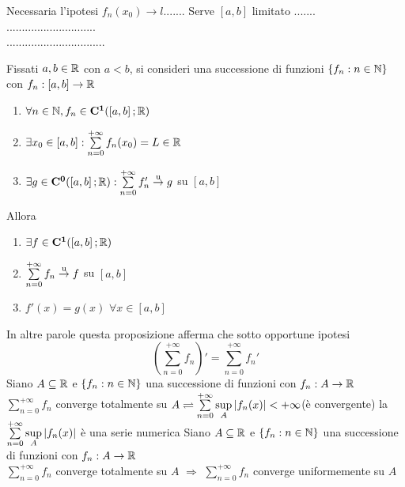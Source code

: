 \observation
Necessaria l'ipotesi $f_n(x_0)\to l$.......
\observation
Serve $\left[a,b\right]$ limitato .......\\
.............................\\
................................\\
\begin{corollary}
	\label{coro:deriv_series_series_of_deriv}
	Fissati $a,b\in \mathbb{R}$ con $a<b$, si consideri una successione di funzioni $\left\{f_n:n\in\mathbb{N}\right\}$ con $f_n:\left[a,b\right]\to \mathbb{R}$
	\begin{enumerate}
		\item $\forall n\in\mathbb{N}, f_n\in \mathbf{C^{1}}(\left[a,b\right]; \mathbb{R})$
		\item $\exists x_0\in\left[a,b\right]: \sum\limits_{n=0}^{+\infty}f_n(x_0)=L\in \mathbb{R}$
		\item $\exists g \in \mathbf{C^{0}}(\left[a,b\right]; \mathbb{R}): \sum\limits_{n=0}^{+\infty}f'_n \overset{\text{u}}{\to} g$ su $\left[a,b\right]$
	\end{enumerate}
	Allora
	\begin{enumerate}
		\item $\exists f\in \mathbf{C^{1}}(\left[a,b\right]; \mathbb{R})$
		\item $\sum\limits_{n=0}^{+\infty}f_n \overset{\text{u}}{\to} f$ su $\left[a,b\right]$
		\item $f'(x)=g(x)$ $\forall x\in\left[a,b\right]$
	\end{enumerate}
\end{corollary}
\observation
In altre parole questa proposizione afferma che sotto opportune ipotesi
\[\left(\sum\limits_{n=0}^{+\infty} f_n \right)' =  \sum\limits_{n=0}^{+\infty}f_n'\]
Siano $A\subseteq  \mathbb{R}$ e $\left\{f_n:n\in\mathbb{N}\right\}$ una successione di funzioni con $f_n:A\to \mathbb{R}$\\
$\sum\limits_{n=0}^{+\infty}f_n$ converge totalmente su $A \rightleftharpoons \sum\limits_{n=0}^{+\infty}\sup\limits_{A}\left|f_n(x)\right|<+\infty$(è convergente)
\observation
la $\sum\limits_{n=0}^{+\infty}\sup\limits_{A}\left|f_n(x)\right|$ è una serie numerica
\proposition
Siano $A\subseteq \mathbb{R}$ e $\left\{f_n:n\in\mathbb{N}\right\}$ una successione di funzioni con $f_n:A\to \mathbb{R}$\\
$\sum\limits_{n=0}^{+\infty}f_n$ converge totalmente su $A$ $\Rightarrow$  $\sum\limits_{n=0}^{+\infty}f_n$ converge uniformemente su $A$

